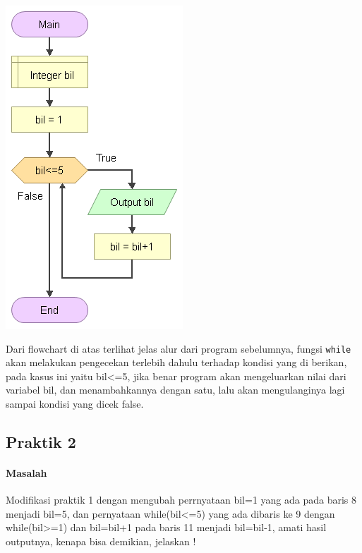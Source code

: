 \documentclass[a4paper,12pt]{article}
\begin{document}
\begin{center}
	\includegraphics[scale=.5]{image--024}
\end{center}
Dari flowchart di atas terlihat jelas alur dari program sebelumnya, fungsi \texttt{while} akan melakukan pengecekan terlebih dahulu terhadap kondisi yang di berikan, pada kasus ini yaitu bil<=5, jika benar program akan mengeluarkan nilai dari variabel bil, dan menambahkannya dengan satu, lalu akan mengulanginya lagi sampai kondisi yang dicek false.

\subsection{Praktik 2}
\paragraph{Masalah\\}
Modifikasi praktik 1 dengan mengubah perrnyataan bil=1 yang ada pada baris 8
menjadi bil=5, dan pernyataan while(bil<=5) yang ada dibaris ke 9 dengan
while(bil>=1) dan bil=bil+1 pada baris 11 menjadi bil=bil-1, amati hasil outputnya,
kenapa bisa demikian, jelaskan !
\end{document}

